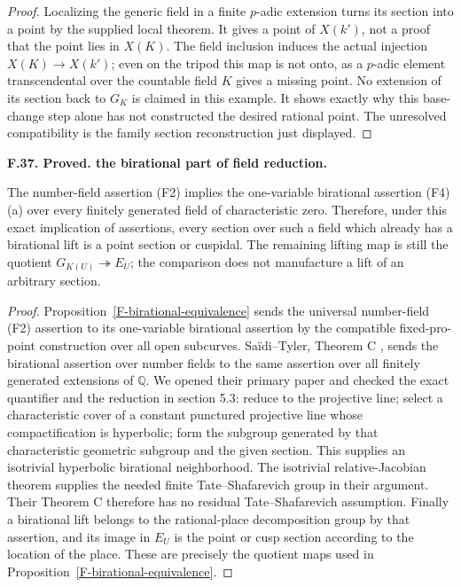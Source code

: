 \documentclass[11pt,oneside]{article}
\makeatletter
\newcounter{statementanchor}
\newenvironment{statement}[3]{%
 \refstepcounter{statementanchor}\def\@currentlabel{#1}%
 \par\addvspace{9pt}\noindent
 \textbf{#1. #2. #3.}\par\nobreak\noindent\ignorespaces
}{\par\addvspace{5pt}}
\makeatother
\begin{document}
\begin{proof}
Localizing the generic field in a finite $p$-adic extension
turns its section into a point by the supplied local theorem.
It gives a point of $X(k')$, not a proof that the point lies
in $X(K)$. The field inclusion induces the actual injection
$X(K)\to X(k')$; even on the tripod this map is not onto,
as a $p$-adic element transcendental over the countable field
$K$ gives a missing point. No extension of its section back
to $G_K$ is claimed in this example. It shows exactly why
this base-change step alone has not constructed the desired
rational point. The unresolved compatibility is the family
section reconstruction just displayed.
\end{proof}

\begin{statement}{F.37}{Proved}{the birational part of field reduction}
\label{st:F.37}
\label{F-birational-field-reduction}
The number-field assertion (F2) implies the one-variable
birational assertion (F4)(a) over every finitely generated
field of characteristic zero. Therefore, under this exact
implication of assertions, every section over such a field
which already has a birational lift is a point section or
cuspidal. The remaining lifting map is still the quotient
$G_{K(U)}\twoheadrightarrow E_U$; the comparison does not
manufacture a lift of an arbitrary section.
\end{statement}
\begin{proof}
Proposition~\ref{F-birational-equivalence} sends the universal
number-field (F2) assertion to its one-variable birational
assertion by the compatible fixed-pro-point construction over
all open subcurves. Sa\"idi--Tyler, Theorem C
\cite{F-SaidiTyler}, sends the birational assertion over number
fields to the same assertion over all finitely generated
extensions of $\mathbb Q$. We opened their primary paper and
checked the exact quantifier and the reduction in section 5.3:
reduce to the projective line; select a characteristic cover of
a constant punctured projective line whose compactification is
hyperbolic; form the subgroup generated by that characteristic
geometric subgroup and the given section. This supplies an
isotrivial hyperbolic birational neighborhood. The isotrivial
relative-Jacobian theorem supplies the needed finite
Tate--Shafarevich group in their argument. Their Theorem C
therefore has no residual Tate--Shafarevich assumption.
Finally a birational lift belongs to the rational-place
decomposition group by that assertion, and its image in
$E_U$ is the point or cusp section according to the location
of the place. These are precisely the quotient maps used in
Proposition~\ref{F-birational-equivalence}.
\end{proof}
\end{document}
